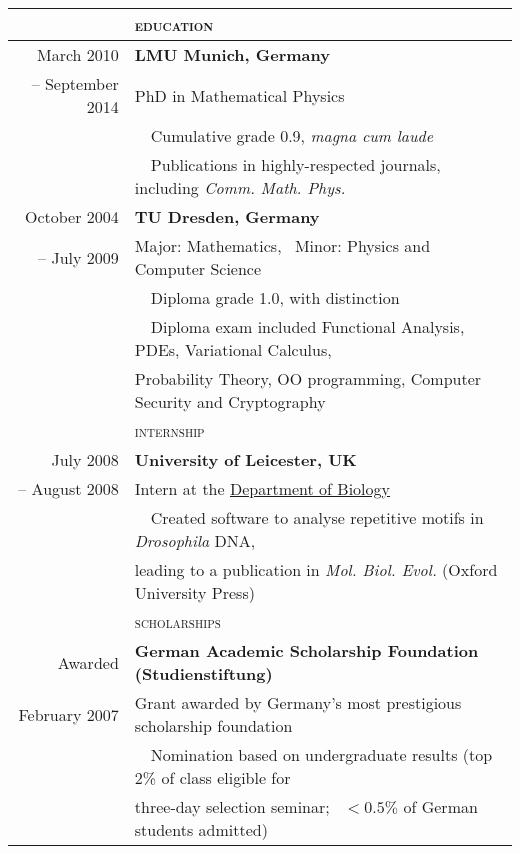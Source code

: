\documentclass[11pt,english,a4paper]{memoir}
\newcommand{\red}{\color{Maroon}}
\newcommand{\header}[1]{%
  \addlinespace[2ex]
  & \large{\red\textsc{\MakeLowercase{#1}}} \tabularnewline
  \midrule}
\newcommand{\n}{\tabularnewline}
\newcommand{\bull}{\Pisymbol{MinionPro-Extra}{146}~~}
\newcommand{\nobull}{\phantom{\bull}}
\newcommand{\Cpp}{C\kern-.03em\raise.16ex\hbox{\small{+\kern-.03em+}}}
\begin{document}
\begin{center}
\begin{tabular}{rl}

  \n
  \header{Education}
  March 2010        & \textbf{LMU Munich, Germany} \n
  -- September 2014 & PhD in Mathematical Physics \n
  & \bull Cumulative grade 0.9, \textit{magna cum laude} \n
  & \bull Publications in highly-respected journals, including \textit{Comm. Math. Phys.}

  \n \addlinespace
  October 2004  & \textbf{TU Dresden, Germany} \n
  -- July 2009  & Major: Mathematics, \ Minor: Physics and Computer Science \n
  & \bull Diploma grade 1.0, with distinction \n
  & \bull Diploma exam included Functional Analysis, PDEs, Variational Calculus, \\
  & \nobull Probability Theory, OO programming, Computer Security and Cryptography


  \n
  \header{Internship}
  July 2008       & \textbf{University of Leicester, UK} \n
  -- August 2008  & Intern at the \href{http://www.le.ac.uk/biology/phh4/}{Department of Biology} \n
  & \bull Created software to analyse repetitive motifs in
  \textit{Drosophila} DNA, \\
  & \nobull leading to a publication in \textit{Mol. Biol. Evol.} (Oxford University Press)
  \n
  \header{Scholarships}
  Awarded & \textbf{German Academic Scholarship Foundation (Studienstiftung)} \n
  February 2007 & Grant awarded by Germany's most prestigious scholarship foundation
  \n
  & \bull Nomination based on undergraduate results (top 2\% of class
  eligible for \\
  & \nobull three-day selection seminar; \ $< 0.5\%$ of German students admitted)
\end{tabular}

\begin{tabular}{rl}



\end{tabular}
\end{center}
\end{document}
